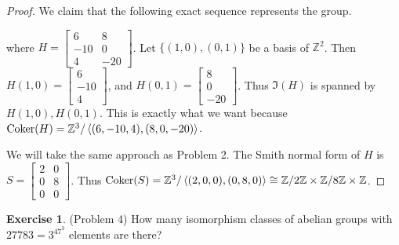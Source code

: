 \documentclass[12pt, psamsfonts]{amsart}
\theoremstyle{definition}
\newtheorem*{exer}{Exercise}
\theoremstyle{remark}
\DeclareMathOperator{\Coker}{Coker}
\numberwithin{equation}{section}
\begin{document}
\begin{proof}
  We claim that the following exact sequence represents the group.
  \begin{center}
  \end{center}
  where $H = \begin{bmatrix} 6 & 8 \\ -10 & 0 \\ 4 & -20 \end{bmatrix}$.
  Let $\{ (1, 0), (0, 1) \}$ be a basis of $\mathbb{Z}^2$.
  Then $H(1, 0) = \begin{bmatrix} 6 \\ -10 \\ 4 \end{bmatrix}$, and $H(0, 1) = \begin{bmatrix} 8 \\ 0 \\ -20 \end{bmatrix}$.
  Thus $\Im(H)$ is spanned by $H(1, 0), H(0, 1)$.
  This is exactly what we want because $\Coker(H) = \mathbb{Z}^3/\ev{(6, -10, 4), (8, 0, -20)}$.

  We will take the same approach as Problem 2.
  The Smith normal form of $H$ is $S = \begin{bmatrix} 2 & 0 \\ 0 & 8 \\ 0 & 0 \end{bmatrix}$.
    Thus $\Coker(S) = \mathbb{Z}^3 / \ev{(2, 0, 0), (0, 8, 0)} \cong \mathbb{Z} / 2\mathbb{Z} \times \mathbb{Z} / 8\mathbb{Z} \times \mathbb{Z}$.
\end{proof}

\begin{exer}{(Problem 4)}
  How many isomorphism classes of abelian groups with $27783 = 3^47^3$ elements are there?
\end{exer}
\end{document}
